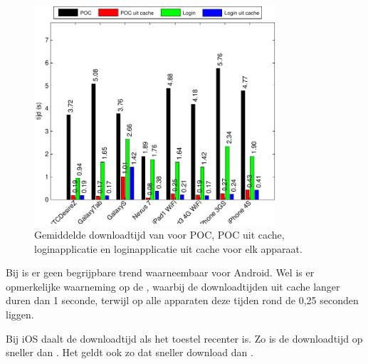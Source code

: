 \begin{figure}
  \centering
  \includegraphics[width=0.8\textwidth]{figuren/performance-lungo.pdf}
  \caption{Gemiddelde downloadtijd van \lungo{} voor POC,  POC uit cache,  loginapplicatie en loginapplicatie uit cache voor elk apparaat.}
  \label{fig:performantie-lungo}
\end{figure}

Bij \lungo{} is er geen begrijpbare trend waarneembaar voor Android.
Wel is er opmerkelijke waarneming op de \gs{}, waarbij de downloadtijden uit cache langer duren dan 1 seconde, terwijl op alle apparaten deze tijden rond de 0,25 seconden liggen.

Bij iOS daalt de downloadtijd als het toestel recenter is.
Zo is de downloadtijd op \ipadiii{} sneller dan \ipadi{}.
Het geldt ook zo dat \iphoneiv{} sneller download dan \iphoneiii{}.


